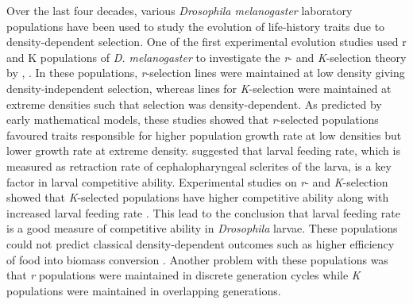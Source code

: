 Over the last four decades, various \textit{Drosophila melanogaster} laboratory populations have been used to study the evolution of life-history traits due to density-dependent selection. One of the first experimental evolution studies used r and K populations of \textit{D. melanogaster} \citep{muellerTradeoffRselectionKselection1981} to investigate the \textit{r}- and \textit{K}-selection theory by \citet{macarthurGENERALIZEDTHEOREMSNATURAL1962}, \citet*{macarthurTheoryIslandBiogeography1967}. In these populations, \textit{r}-selection lines were maintained at low density giving density-independent selection, whereas lines for \textit{K}-selection were maintained at extreme densities such that selection was density-dependent. As predicted by early mathematical models, these studies showed that \textit{r}-selected populations favoured traits responsible for higher population growth rate at low densities but lower growth rate at extreme density. \citet{bakkerAnalysisFactorsWhich1962,burnetGeneticAnalysisLarval1977} suggested that larval feeding rate, which is measured as retraction rate of cephalopharyngeal sclerites of the larva, is a key factor in larval competitive ability. Experimental studies on \textit{r}- and \textit{K}-selection showed that \textit{K}-selected populations have higher competitive ability along with increased larval feeding rate \citep{joshiEvolutionHigherFeeding1988}. This lead to the conclusion that larval feeding rate is a good measure of competitive ability in \textit{Drosophila} larvae. These populations could not predict classical density-dependent outcomes such as higher efficiency of food into biomass conversion \citep{muellerDensitydependentNaturalSelection1990}. Another problem with these populations was that \textit{r} populations were maintained in discrete generation cycles while \textit{K} populations were maintained in overlapping generations. \\\\
